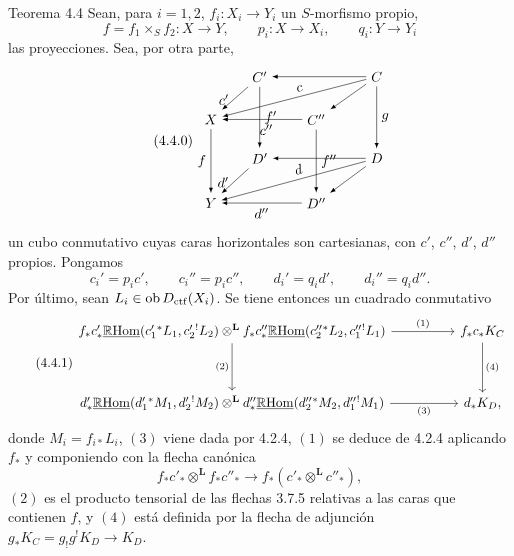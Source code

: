 \begin{statement}{Teorema 4.4}
Sean, para $i=1,2$, $f_i:X_i\longrightarrow Y_i$ un $S$-morfismo propio,
\[
f=f_1\times_S f_2:X\longrightarrow Y,\qquad
p_i:X\longrightarrow X_i,\qquad q_i:Y\longrightarrow Y_i
\]
las proyecciones. Sea, por otra parte,
\begin{equation}
\tag{4.4.0}
\begin{tikzpicture}[>=latex,baseline=(current bounding box.center),scale=0.98]
\node (Cp) at (0,2.1) {$C'$};
\node (C) at (3.0,2.1) {$C$};
\node (X) at (-1.25,1.0) {$X$};
\node (Cpp) at (1.45,1.0) {$C''$};
\node (Dp) at (0,0) {$D'$};
\node (D) at (3.0,0) {$D$};
\node (Y) at (-1.25,-1.15) {$Y$};
\node (Dpp) at (1.45,-1.15) {$D''$};
\draw[->] (C) -- (Cp);
\draw[->] (Cp) -- node[left,pos=.55] {$c'$} (X);
\draw[->] (C) -- node[above,sloped,pos=.45] {$c$} (X);
\draw[->] (C) -- (Cpp);
\draw[->] (Cpp) -- node[below,pos=.45] {$c''$} (X);
\draw[->] (Cp) -- node[right] {$f'$} (Dp);
\draw[->] (Cpp) -- node[right] {$f''$} (Dpp);
\draw[->] (C) -- node[right] {$g$} (D);
\draw[->] (X) -- node[left] {$f$} (Y);
\draw[->] (D) -- (Dp);
\draw[->] (Dp) -- node[left,pos=.55] {$d'$} (Y);
\draw[->] (D) -- node[above,sloped,pos=.45] {$d$} (Y);
\draw[->] (D) -- (Dpp);
\draw[->] (Dpp) -- node[below] {$d''$} (Y);
\end{tikzpicture}
\end{equation}
un cubo conmutativo cuyas caras horizontales son cartesianas, con $c'$, $c''$, $d'$, $d''$ propios. Pongamos
\[
c_i'=p_i c',\qquad c_i''=p_i c'',\qquad d_i'=q_i d',\qquad d_i''=q_i d''.
\]
Por último, sean $L_i\in\operatorname{ob} D_{\mathrm{ctf}}(X_i)$. Se tiene entonces un cuadrado conmutativo
\begin{equation}
\tag{4.4.1}
\begin{tikzcd}[column sep=huge,row sep=huge]
f_*c'_*\uRHom(c_1'{}^*L_1,c_2'{}^!L_2)\otimes^{\mathbf L}
f_*c''_*\uRHom(c_2''{}^*L_2,c_1''{}^!L_1)
 \arrow[r,"(1)"] \arrow[d,"(2)"'] &
f_*c_*K_C \arrow[d,"(4)"] \\
d'_*\uRHom(d_1'{}^*M_1,d_2'{}^!M_2)\otimes^{\mathbf L}
d''_*\uRHom(d_2''{}^*M_2,d_1''{}^!M_1)
 \arrow[r,"(3)"'] &
d_*K_D ,
\end{tikzcd}
\end{equation}
donde $M_i=f_{i*}L_i$, $(3)$ viene dada por 4.2.4, $(1)$ se deduce de 4.2.4 aplicando $f_*$ y componiendo con la flecha canónica
\[
f_*c'_*\otimes^{\mathbf L} f_*c''_*\longrightarrow f_*(c'_*\otimes^{\mathbf L}c''_*),
\]
$(2)$ es el producto tensorial de las flechas 3.7.5 relativas a las caras que contienen $f$, y $(4)$ está definida por la flecha de adjunción $g_*K_C=g_!g^!K_D\longrightarrow K_D$.
\end{statement}

